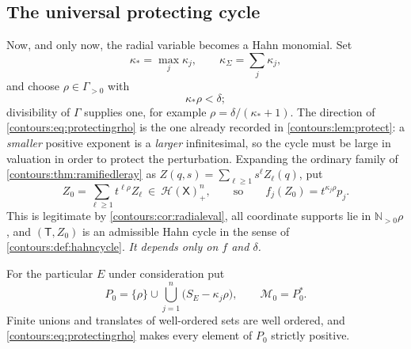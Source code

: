\documentclass[11pt,letterpaper]{article}
\theoremstyle{definition}
\theoremstyle{remark}
\newcommand{\N}{\mathbb N}\newcommand{\Z}{\mathbb Z}\newcommand{\DD}{\mathbb D}
\newcommand{\HH}{\mathcal H}\newcommand{\A}{\mathscr A}\newcommand{\OO}{\mathcal O}
\numberwithin{equation}{section}
\begin{document}
\subsection{The universal protecting cycle}
\label{contours:subsec:protecting}
Now, and only now, the radial variable becomes a Hahn monomial. Set
\begin{equation}\label{contours:eq:kappastar}
  \kappa_*=\max_j\kappa_j,\qquad \kappa_\Sigma=\sum_j\kappa_j,
\end{equation}
and choose $\rho\in\Gamma_{>0}$ with
\begin{equation}\label{contours:eq:protectingrho}
  \kappa_*\rho<\delta ;
\end{equation}
divisibility of $\Gamma$ supplies one, for example $\rho=\delta/(\kappa_*+1)$.
The direction of \eqref{contours:eq:protectingrho} is the one already recorded
in \cref{contours:lem:protect}: a \emph{smaller} positive exponent is a
\emph{larger} infinitesimal, so the cycle must be large in valuation in order to
protect the perturbation. Expanding the ordinary family of
\cref{contours:thm:ramifiedleray} as $Z(q,s)=\sum_{\ell\ge1}s^\ell Z_\ell(q)$,
put
\begin{equation}\label{contours:eq:Zzero}
  Z_0=\sum_{\ell\ge1}t^{\ell\rho}Z_\ell
  \ \in\ \HH(\mathsf X)_+^n ,
  \qquad\text{so}\qquad
  f_j(Z_0)=t^{\kappa_j\rho}p_j .
\end{equation}
This is legitimate by \cref{contours:cor:radialeval}, all coordinate supports lie
in $\N_{>0}\rho$, and $(\mathsf T,Z_0)$ is an admissible Hahn cycle in the sense
of \cref{contours:def:hahncycle}. \emph{It depends only on $f$ and $\delta$.}

For the particular $E$ under consideration put
\begin{equation}\label{contours:eq:Pzero}
  P_0=\{\rho\}\cup\bigcup_{j=1}^n\bigl(S_E-\kappa_j\rho\bigr),
  \qquad \mathcal M_0=P_0^* .
\end{equation}
Finite unions and translates of well-ordered sets are well ordered, and
\eqref{contours:eq:protectingrho} makes every element of $P_0$ strictly
positive.
\end{document}
